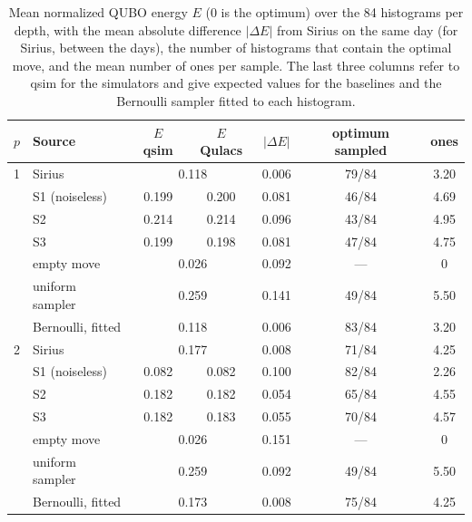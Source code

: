 \begin{table}[t]
\caption{Mean normalized QUBO energy $E$ (0 is the optimum) over the 84 histograms per depth, with the mean absolute difference $|\Delta E|$ from Sirius on the same day (for Sirius, between the days), the number of histograms that contain the optimal move, and the mean number of ones per sample. The last three columns refer to qsim for the simulators and give expected values for the baselines and the Bernoulli sampler fitted to each histogram.}
\label{tab:h3}
\centering
\small
\begin{tabular}{clccccc}
\toprule
$p$ & Source & $E$ qsim & $E$ Qulacs & $|\Delta E|$ & optimum sampled & ones \\
\midrule
1 & Sirius & \multicolumn{2}{c}{0.118} & 0.006 & 79/84 & 3.20 \\
 & S1 (noiseless) & 0.199 & 0.200 & 0.081 & 46/84 & 4.69 \\
 & S2 & 0.214 & 0.214 & 0.096 & 43/84 & 4.95 \\
 & S3 & 0.199 & 0.198 & 0.081 & 47/84 & 4.75 \\
 & empty move & \multicolumn{2}{c}{0.026} & 0.092 & --- & 0 \\
 & uniform sampler & \multicolumn{2}{c}{0.259} & 0.141 & 49/84 & 5.50 \\
 & Bernoulli, fitted & \multicolumn{2}{c}{0.118} & 0.006 & 83/84 & 3.20 \\
\midrule
2 & Sirius & \multicolumn{2}{c}{0.177} & 0.008 & 71/84 & 4.25 \\
 & S1 (noiseless) & 0.082 & 0.082 & 0.100 & 82/84 & 2.26 \\
 & S2 & 0.182 & 0.182 & 0.054 & 65/84 & 4.55 \\
 & S3 & 0.182 & 0.183 & 0.055 & 70/84 & 4.57 \\
 & empty move & \multicolumn{2}{c}{0.026} & 0.151 & --- & 0 \\
 & uniform sampler & \multicolumn{2}{c}{0.259} & 0.092 & 49/84 & 5.50 \\
 & Bernoulli, fitted & \multicolumn{2}{c}{0.173} & 0.008 & 75/84 & 4.25 \\
\bottomrule
\end{tabular}
\end{table}
